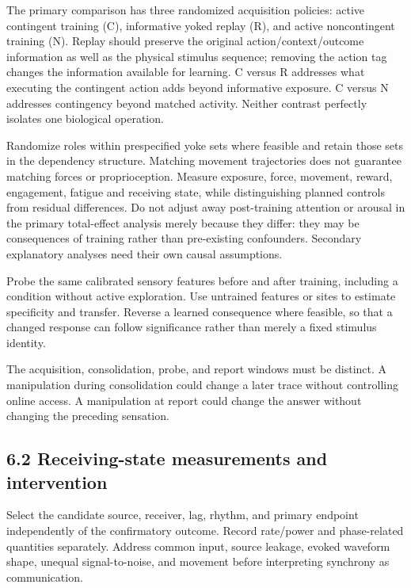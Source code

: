 \documentclass[
  american,
  11pt,
  letterpaper,
]{article}
\begin{document}
The primary comparison has three randomized acquisition policies: active contingent training (C), informative yoked replay (R), and active noncontingent training (N). Replay should preserve the original action/context/outcome information as well as the physical stimulus sequence; removing the action tag changes the information available for learning. C versus R addresses what executing the contingent action adds beyond informative exposure. C versus N addresses contingency beyond matched activity. Neither contrast perfectly isolates one biological operation.

Randomize roles within prespecified yoke sets where feasible and retain those sets in the dependency structure. Matching movement trajectories does not guarantee matching forces or proprioception. Measure exposure, force, movement, reward, engagement, fatigue and receiving state, while distinguishing planned controls from residual differences. Do not adjust away post-training attention or arousal in the primary total-effect analysis merely because they differ: they may be consequences of training rather than pre-existing confounders. Secondary explanatory analyses need their own causal assumptions.

Probe the same calibrated sensory features before and after training, including a condition without active exploration. Use untrained features or sites to estimate specificity and transfer. Reverse a learned consequence where feasible, so that a changed response can follow significance rather than merely a fixed stimulus identity.

The acquisition, consolidation, probe, and report windows must be distinct. A manipulation during consolidation could change a later trace without controlling online access. A manipulation at report could change the answer without changing the preceding sensation.

\subsection{6.2 Receiving-state measurements and intervention}\label{receiving-state-measurements-and-intervention}

Select the candidate source, receiver, lag, rhythm, and primary endpoint independently of the confirmatory outcome. Record rate/power and phase-related quantities separately. Address common input, source leakage, evoked waveform shape, unequal signal-to-noise, and movement before interpreting synchrony as communication.
\end{document}
